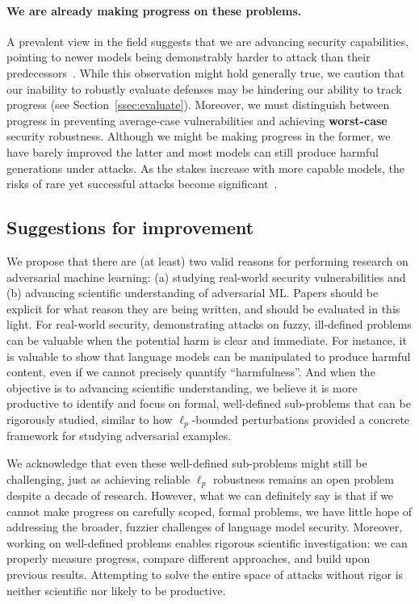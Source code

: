 \paragraph{We are already making progress on these problems.} A prevalent view in the field suggests that we are advancing security capabilities, pointing to newer models being demonstrably harder to attack than their predecessors~\citep{achiam2023gpt,zaremba2025trading}. While this observation might hold generally true, we caution that our inability to robustly evaluate defenses may be hindering our ability to track progress (see Section~\ref{ssec:evaluate}). Moreover, we must distinguish between progress in preventing average-case vulnerabilities and achieving \textbf{worst-case} security robustness. Although we might be making progress in the former, we have barely improved the latter and most models can still produce harmful generations under attacks. As the stakes increase with more capable models, the risks of rare yet successful attacks become significant~\citep{anthropicasl}.

\subsection{Suggestions for improvement}



We propose that there are (at least) two valid reasons for performing research on adversarial machine learning: (a) studying real-world security vulnerabilities and (b) advancing scientific understanding of adversarial ML. Papers should be explicit for what reason they are being written, and should be evaluated in this light. For real-world security, demonstrating attacks on fuzzy, ill-defined problems can be valuable when the potential harm is clear and immediate. For instance, it is valuable to show that language models can be manipulated to produce harmful content, even if we cannot precisely quantify ``harmfulness''. And when the objective is to advancing scientific understanding, we believe it is more productive to identify and focus on formal, well-defined sub-problems that can be rigorously studied, similar to how $\ell_p$-bounded perturbations provided a concrete framework for studying adversarial examples.

We acknowledge that even these well-defined sub-problems might still be challenging, just as achieving reliable $\ell_p$ robustness remains an open problem despite a decade of research. However, what we can definitely say is that if we cannot make progress on carefully scoped, formal problems, we have little hope of addressing the broader, fuzzier challenges of language model security. Moreover, working on well-defined problems enables rigorous scientific investigation: we can properly measure progress, compare different approaches, and build upon previous results. Attempting to solve the entire space of attacks without rigor is neither scientific nor likely to be productive.










